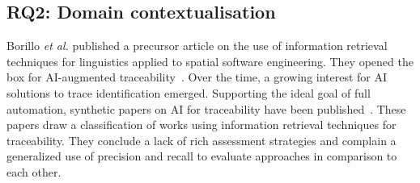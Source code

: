 \subsection{RQ2:  Domain contextualisation}\label{sec:}
Borillo \textit{et al.} published a precursor article on the use of information retrieval techniques for linguistics applied to spatial software engineering. They opened the box for AI-augmented traceability~\cite{borillo1992-linguistic-engineering-to-spacial-SE}.
Over the time, a growing interest for AI solutions to trace identification emerged. Supporting the ideal goal of full automation, synthetic papers on AI for traceability have been published~\cite{borg2012-tracea-taxonomy-for-IR-tools,delucia2012-information-retrieval-for-traceability,borg2013-IR-in-traceability-birds-view,borg2014-SmS-IR-for-traceability}. These papers draw a classification of works using information retrieval techniques for traceability. They conclude a lack of rich assessment strategies and complain a generalized use of precision and recall to evaluate approaches in comparison to each other. 

